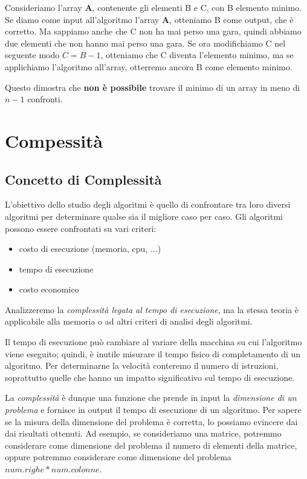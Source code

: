 \documentclass[a4paper,12pt,twoside]{report}
\begin{document}
Consideriamo l'array \textbf{A}, contenente gli elementi B e C, con B elemento minimo.
Se diamo come input all'algoritmo l'array \textbf{A}, otteniamo B come output, che 
\`{e} corretto. Ma sappiamo anche che C non ha mai perso una gara, quindi abbiamo due
elementi che non hanno mai perso una gara. Se ora modifichiamo C nel seguente modo 
$C = B-1$, otteniamo che C diventa l'elemento minimo, ma se applichiamo l'algoritmo 
all'array, otterremo ancora B come elemento minimo. 

Questo dimostra che \textbf{non \`{e} possibile} trovare il minimo di un array in meno di $n-1$ 
confronti.
\section{Compessit\`{a}}
\subsection{Concetto di Complessit\`{a}}
L'obiettivo dello studio degli algoritmi \`{e} quello di confrontare tra loro diversi 
algoritmi per determinare qualse sia il migliore caso per caso. Gli algoritmi possono
essere confrontati su vari criteri:
\begin{itemize}
\item costo di esecuzione (memoria, cpu, ...)
\item tempo di esecuzione
\item costo economico
\end{itemize}

Analizzeremo la \emph{complessit\`{a} legata al tempo di esecuzione}, ma la stessa
teoria \`{e} applicabile alla memoria o ad altri criteri di analisi degli algoritmi.

Il tempo di esecuzione pu\`{o} cambiare al variare della macchina su cui l'algoritmo 
viene eseguito; quindi, \`{e} inutile misurare il tempo fisico di completamento di un
algoritmo. Per determinarne la velocit\`{a} conteremo il numero di istruzioni, 
soprattutto quelle che hanno un impatto significativo sul tempo di esecuzione.

La \emph{complessit\`{a}} \`{e} dunque una funzione che prende in input la 
\emph{dimensione di un problema} e fornisce in output il tempo di esecuzione di un
algoritmo. Per sapere se la misura della dimensione del problema \`{e} corretta, lo
possiamo evincere dai dai risultati ottenuti. Ad esempio, se consideriamo una matrice, 
potremmo considerare come dimensione del problema il numero di elementi della matrice, 
oppure potremmo considerare come dimensione del problema $num. righe * num. colonne$.
\end{document}

